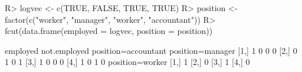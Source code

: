 \begin{Schunk}
% --begin: "fcut.logfact"
\begin{Sinput}
R> logvec <- c(TRUE, FALSE, TRUE, TRUE)
R> position <- factor(c("worker", "manager", "worker", "accountant"))
R> fcut(data.frame(employed = logvec, position = position))
\end{Sinput}
\begin{Soutput}
     employed not.employed position=accountant position=manager
[1,]        1            0                   0                0
[2,]        0            1                   0                1
[3,]        1            0                   0                0
[4,]        1            0                   1                0
     position=worker
[1,]               1
[2,]               0
[3,]               1
[4,]               0
\end{Soutput}
%
% --end: "fcut.logfact"
\end{Schunk}
